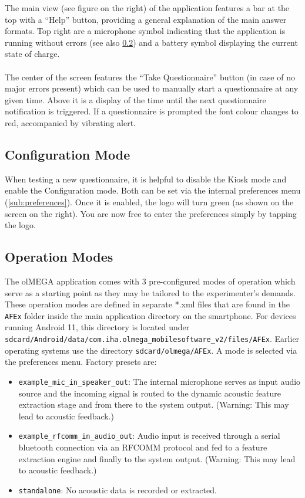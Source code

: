 \documentclass[11pt,a4paper,titlepage]{article}
\newcommand\ClrSquare[1]{\textcolor{#1}{\rule{7pt}{7pt}}}
\begin{document}
The main view (see figure on the right) of the application features a bar at the top with a ``Help'' button, providing a general explanation of the main answer formats. Top right are a microphone symbol indicating that the application is running without errors (see also \ref{sub:operationmode}) and a battery symbol displaying the current state of charge.\\
\\
The center of the screen features the ``Take Questionnaire'' button (in case of no major errors present) which can be used to manually start a questionnaire at any given time. Above it is a display of the time until the next questionnaire notification is triggered. If a questionnaire is prompted the font colour changes to red, accompanied by vibrating alert.



\subsection{Configuration Mode}\label{sub:experimenter}

When testing a new questionnaire, it is helpful to disable the Kiosk mode and enable the Configuration mode. Both can be set via the internal preferences menu (\ref{sub:preferences}). Once it is enabled, the logo will turn green (as shown on the screen on the right). You are now free to enter the preferences simply by tapping the logo. 


\subsection{Operation Modes}\label{sub:operationmode}

The olMEGA application comes with 3 pre-configured modes of operation which serve as a starting point as they may be tailored to the experimenter's demands. These operation modes are defined in separate *.xml files that are found in the \texttt{AFEx} folder inside the main application directory on the smartphone. For devices running Android 11, this directory is located under \texttt{sdcard/Android/data/com.iha.olmega\_mobilesoftware\_v2/files/AFEx}. Earlier operating systems use the directory \texttt{sdcard/olmega/AFEx}.  A mode is selected via the preferences menu. Factory presets are:

\begin{itemize}[label=\ClrSquare{jadeRed}]
	\item \texttt{example\_mic\_in\_speaker\_out}: The internal microphone serves as input audio source and the incoming signal is routed to the dynamic acoustic feature extraction stage and from there to the system output. (Warning: This may lead to acoustic feedback.)
	\item \texttt{example\_rfcomm\_in\_audio\_out}: Audio input is received through a serial bluetooth connection via an RFCOMM protocol and fed to a feature extraction engine and finally to the system output. (Warning: This may lead to acoustic feedback.)
	\item \texttt{standalone}: No acoustic data is recorded or extracted.
\end{itemize}
\end{document}
